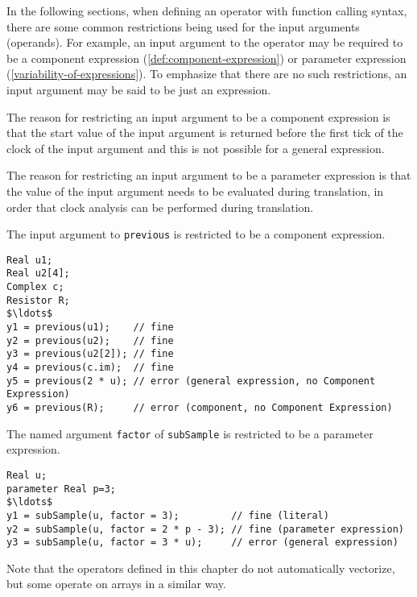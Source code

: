 In the following sections, when defining an operator with function calling syntax, there are some common restrictions being used for the input arguments (operands).  For example, an input argument to the operator may be required to be a component expression (\cref{def:component-expression}) or parameter expression (\cref{variability-of-expressions}).  To emphasize that there are no such restrictions, an input argument may be said to be just an expression.

\begin{nonnormative}
The reason for restricting an input argument to be a component expression is that the start value of the input argument is returned before the first tick of the clock of the input argument and this
is not possible for a general expression.

The reason for restricting an input argument to be a parameter expression is that the value of the input argument needs to be evaluated during translation, in order that clock analysis can be performed during translation.
\end{nonnormative}

\begin{example}
The input argument to \lstinline!previous! is restricted to be a component expression.
\begin{lstlisting}[language=modelica]
Real u1;
Real u2[4];
Complex c;
Resistor R;
$\ldots$
y1 = previous(u1);    // fine
y2 = previous(u2);    // fine
y3 = previous(u2[2]); // fine
y4 = previous(c.im);  // fine
y5 = previous(2 * u); // error (general expression, no Component Expression)
y6 = previous(R);     // error (component, no Component Expression)
\end{lstlisting}
\end{example}

\begin{example}
The named argument \lstinline!factor! of \lstinline!subSample! is restricted to be a parameter expression.
\begin{lstlisting}[language=modelica]
Real u;
parameter Real p=3;
$\ldots$
y1 = subSample(u, factor = 3);         // fine (literal)
y2 = subSample(u, factor = 2 * p - 3); // fine (parameter expression)
y3 = subSample(u, factor = 3 * u);     // error (general expression)
\end{lstlisting}
\end{example}

Note that the operators defined in this chapter do not automatically vectorize,
but some operate on arrays in a similar way.

